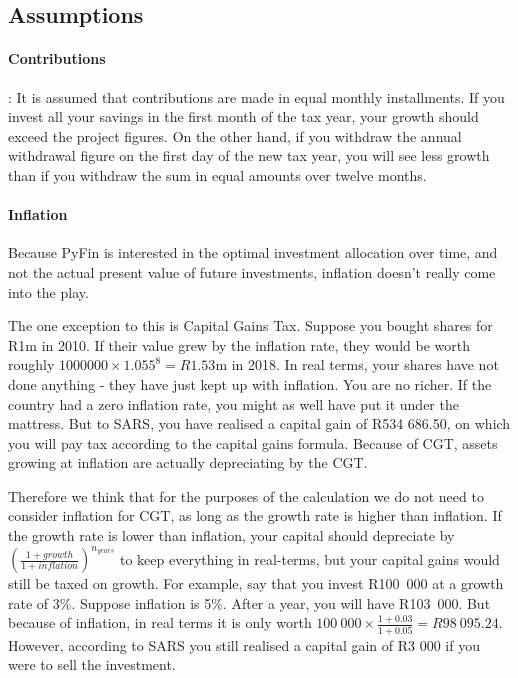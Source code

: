 \documentclass[a4paper, justified]{tufte-handout}
\begin{document}
\subsection{Assumptions}

\paragraph{Contributions}:
It is assumed that contributions are made in equal monthly installments. If you invest all your savings in the first month of the tax year, your growth should exceed the project figures. On the other hand, if you withdraw the annual withdrawal figure on the first day of the new tax year, you will see less growth than if you withdraw the sum in equal amounts over twelve months.

\paragraph{Inflation} Because PyFin is interested in the optimal investment allocation over time, and not the actual present value of future investments, inflation doesn't really come into the play.

The one exception to this is Capital Gains Tax. Suppose you bought shares for R1m in 2010. If their value grew by the inflation rate, they would be worth roughly $1000000\times1.055^8 = R1.53$m in 2018. In real terms, your shares have not done anything - they have just kept up with inflation. You are no richer. If the country had a zero inflation rate, you might as well have put it under the mattress. But to SARS, you have realised a capital gain of R534 686.50, on which you will pay tax according to the capital gains formula. Because of CGT, assets growing at inflation are actually depreciating by the CGT.

Therefore we think that for the purposes of the calculation we do not need to consider inflation for CGT, as long as the growth rate is higher than inflation. If the growth rate is lower than inflation, your capital should depreciate by $\left(\frac{1+growth}{1 + inflation}\right)^{n_{years}}$ to keep everything in real-terms, but your capital gains would still be taxed on growth. For example, say that you invest R100~000 at a growth rate of 3\%. Suppose inflation is 5\%. After a year, you will have R103~000. But because of inflation, in real terms it is only worth $100~000 \times \frac{1+0.03}{1+0.05} = R98~095.24.$ However, according to SARS you still realised a capital gain of R3 000 if you were to sell the investment.
\end{document}
